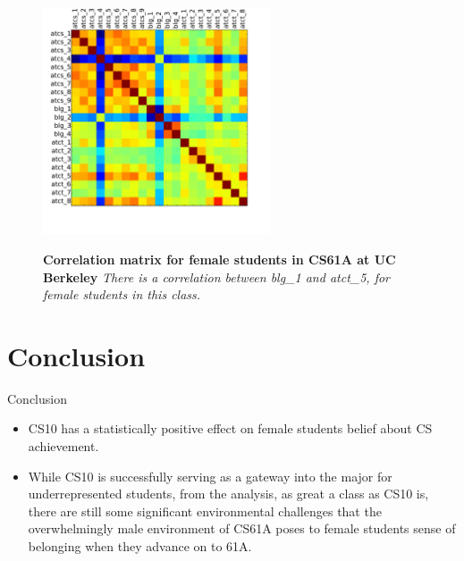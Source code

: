 \documentclass{beamer}                  %
\begin{document}
\begin{frame}
  \begin{figure}[!htbp]
    \centering
    \includegraphics[width=0.6\textwidth]{cs61a_female_corr}
    \label{corr_cs61a_female}
%
\caption {\textbf{Correlation matrix for female students in CS61A at UC Berkeley}
\textit{There is a correlation between blg\_1 and atct\_5, for female students in this class. }}
\label{fig:corrFemale}
\end{figure}
\end{frame}

\section{Conclusion}

\begin{frame}{Conclusion}

  \begin{itemize}
  \item CS10 has a statistically positive effect on female students belief about CS achievement.
  \item While CS10 is successfully serving as a gateway into the major for underrepresented students, from the analysis, as great a class as CS10 is, there are still some significant environmental challenges that the overwhelmingly male environment of CS61A poses to female students sense of belonging when they advance on to 61A.
  \end{itemize}

\end{frame}


\clearpage
\end{document}
